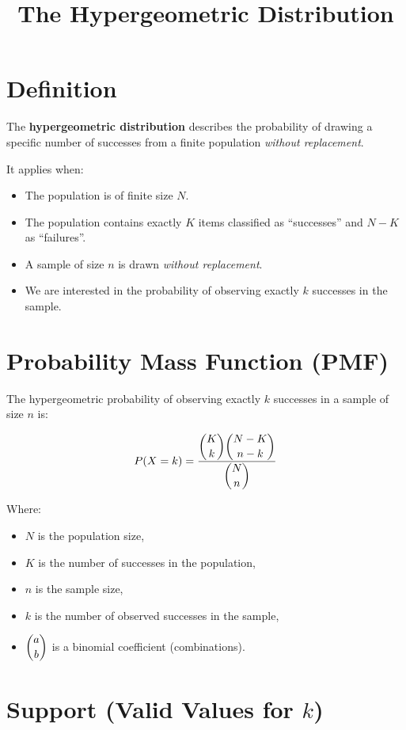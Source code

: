 \documentclass[12pt]{article}
\title{The Hypergeometric Distribution}
\author{}
\date{}
\begin{document}
\maketitle

\section*{Definition}

The \textbf{hypergeometric distribution} describes the probability of drawing a specific number of successes from a finite population \emph{without replacement}.

\bigskip

\noindent It applies when:
\begin{itemize}
    \item The population is of finite size $N$.
    \item The population contains exactly $K$ items classified as ``successes'' and $N-K$ as ``failures''.
    \item A sample of size $n$ is drawn \emph{without replacement}.
    \item We are interested in the probability of observing exactly $k$ successes in the sample.
\end{itemize}

\section*{Probability Mass Function (PMF)}

The hypergeometric probability of observing exactly $k$ successes in a sample of size $n$ is:

\[
P(X = k) = \frac{\dbinom{K}{k} \dbinom{N-K}{n-k}}{\dbinom{N}{n}}
\]

Where:
\begin{itemize}
    \item $N$ is the population size,
    \item $K$ is the number of successes in the population,
    \item $n$ is the sample size,
    \item $k$ is the number of observed successes in the sample,
    \item $\dbinom{a}{b}$ is a binomial coefficient (combinations).
\end{itemize}

\section*{Support (Valid Values for $k$)}
\end{document}
